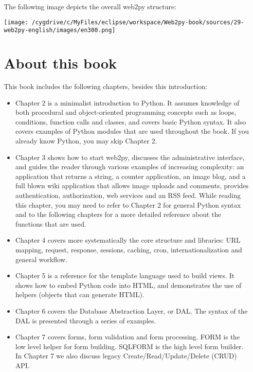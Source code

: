 \documentclass[justified,sixbynine,notoc]{tufte-book}
\begin{document}
\begin{fullwidth}
The following image depicts the overall web2py structure:


\goodbreak\begin{center}\texttt{[image: /cygdrive/c/MyFiles/eclipse/workspace/Web2py-book/sources/29-web2py-english/images/en300.png]}\end{center}


\goodbreak\section{About this book}

This book includes the following chapters, besides this introduction:
\begin{itemize}
\item Chapter 2 is a minimalist introduction to Python. It assumes knowledge of both procedural and object-oriented programming concepts such as loops, conditions, function calls and classes, and covers basic Python syntax. It also covers examples of Python modules that are used throughout the book. If you already know Python, you may skip Chapter 2.

\item Chapter 3 shows how to start web2py, discusses the administrative interface, and guides the reader through various examples of increasing complexity: an application that returns a string, a counter application, an image blog, and a full blown wiki application that allows image uploads and comments, provides authentication, authorization, web services and an RSS feed. While reading this chapter, you may need to refer to Chapter 2 for general Python syntax and to the following chapters for a more detailed reference about the functions that are used.

\item Chapter 4 covers more systematically the core structure and libraries: URL mapping, request, response, sessions, caching, cron, internationalization and general workflow.

\item Chapter 5 is a reference for the template language used to build views. It shows how to embed Python code into HTML, and demonstrates the use of helpers (objects that can generate HTML).

\item Chapter 6 covers the Database Abstraction Layer, or DAL. The syntax of the DAL is presented through a series of examples.

\item Chapter 7 covers forms, form validation and form processing. FORM is the low level helper for form building. SQLFORM is the high level form builder. In Chapter 7 we also discuss legacy Create/Read/Update/Delete (CRUD) API.


\end{itemize}
\end{fullwidth}
\end{document}
